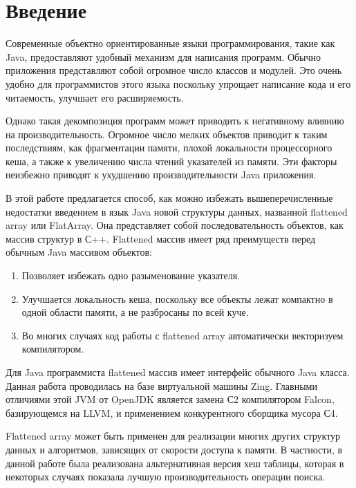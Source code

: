 \section{Введение}
Современные объектно ориентированные языки программирования, такие как Java, предоставляют удобный механизм для написания программ. Обычно приложения представляют собой огромное число классов и модулей. Это очень удобно для программистов этого языка поскольку упрощает написание кода и его читаемость, улучшает его расширяемость.
\par
Однако такая декомпозиция программ может приводить к негативному влиянию на производительность. Огромное число мелких объектов приводит к таким последствиям, как фрагментации памяти, плохой локальности процессорного кеша, а также к увеличению числа чтений указателей из памяти. Эти факторы неизбежно приводят к ухудшению производительности Java приложения.
\par
В этой работе предлагается способ, как можно избежать вышеперечисленные недостатки введением в язык Java новой структуры данных, названной flattened array или FlatArray. Она представляет собой последовательность объектов, как массив структур в С++. Flattened массив имеет ряд преимуществ перед обычным Java массивом объектов:

\begin{enumerate}[align=left]
	\item Позволяет избежать одно разыменование указателя.
	\item Улучшается локальность кеша, поскольку все объекты лежат компактно в одной области памяти, а не разбросаны по всей куче.
	\item Во многих случаях код работы с flattened array автоматически векторизуем компилятором. 
\end{enumerate}

Для Java программиста flattened массив имеет интерфейс обычного Java класса. Данная работа проводилась на базе виртуальной машины Zing. Главными отличиями этой JVM от OpenJDK является замена С2 компилятором Falcon, базирующемся на LLVM, и применением конкурентного сборщика мусора С4\cite{C4collector}.
\par
Flattened array может быть применен для реализации многих других структур данных и алгоритмов, зависящих от скорости доступа к памяти. В частности, в данной работе была реализована альтернативная версия хеш таблицы, которая в некоторых случаях показала лучшую производительность операции поиска.

